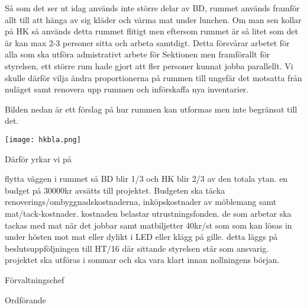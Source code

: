 \documentclass[../_main/handlingar.tex]{subfiles}
\begin{document}

Så som det ser ut idag används inte större delar av BD, rummet används framför allt till att hänga av sig kläder och värma mat under lunchen. Om man sen kollar på HK så används detta rummet flitigt men eftersom rummet är så litet som det är kan max 2-3 personer sitta och arbeta samtdigt. Detta försvårar arbetet för alla som ska utföra admistrativt arbete för Sektionen men framförallt för styrelsen, ett större rum hade gjort att fler personer kunnat jobba parallellt. Vi skulle därför vilja ändra proportionerna på rummen till ungefär det motsatta från nuläget samt renovera upp rummen och införskaffa nya inventarier.

Bilden nedan är ett förslag på hur rummen kan utformas men inte begränsat till det.

\begin{center}
    \texttt{[image: hkbla.png]}
\end{center}

\newpage

Därför yrkar vi på
\begin{attsatser}
    \att flytta väggen i rummet så BD blir 1/3 och HK blir 2/3 av den totala ytan.
    \att en budget på 30000kr avsätts till projektet. Budgeten ska täcka renoverings/ombyggnadskostnaderna, inköpskostnader av möblemang samt mat/tack-kostnader.
    \att kostnaden belastar utrustningsfonden.
    \att de som arbetar ska tackas med mat när det jobbar samt matbiljetter 40kr/st som som kan lösas in under hösten mot mat eller dylikt i LED eller klägg på gille.
    \att detta läggs på beslutsuppföljningen till HT/16 där sittande styrelsen står som ansvarig.
    \att projektet ska utföras i sommar och ska vara klart innan nollningens början.
\end{attsatser}

\begin{signatures}{2}
    \ist
    \signature{Anders Nilsson}{Förvaltningschef}
    \signature{Fredrik Peterson}{Ordförande}
\end{signatures}
\end{document}
